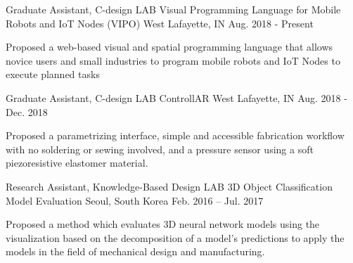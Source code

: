 \begin{cventries}

\cventry
{Graduate Assistant, C-design LAB} %
{Visual Programming Language for Mobile Robots and IoT Nodes (VIPO)} %
{West Lafayette, IN} %
{Aug. 2018 - Present} %
{ %
\begin{cvitems}
\item {Proposed a web-based visual and spatial programming language that allows novice users and small industries to program mobile robots and IoT Nodes to execute planned tasks}
\end{cvitems} 
}


\cventry
{Graduate Assistant, C-design LAB} %
{ControllAR} %
{West Lafayette, IN} %
{Aug. 2018 - Dec. 2018} %
{ %
\begin{cvitems}
\item {Proposed a parametrizing interface, simple and accessible fabrication workflow with no soldering or sewing involved, and a pressure sensor using a soft piezoresistive elastomer material.}
\end{cvitems}
}


\cventry
{Research Assistant, Knowledge-Based Design LAB} %
{3D Object Classification Model Evaluation} %
{Seoul, South Korea} %
{Feb. 2016 – Jul. 2017} %
{ %
\begin{cvitems}
\item {Proposed a method which evaluates 3D neural network models using the visualization based on the decomposition of a model’s predictions to apply the models in the field of mechanical design and manufacturing.}
\end{cvitems}
}

\end{cventries}